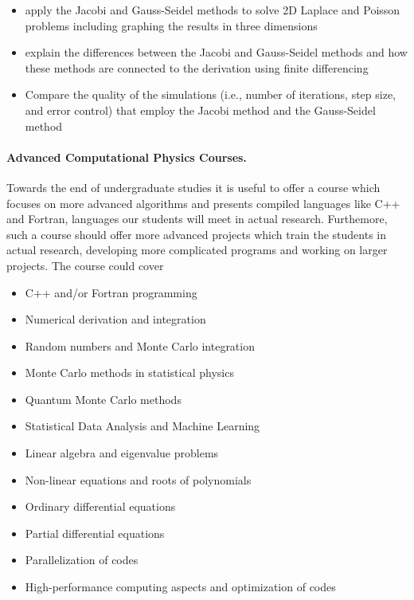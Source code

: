 \documentclass[graybox,envcountchap,sectrefs]{svmult}
\begin{document}
\begin{itemize}
\item apply the Jacobi and Gauss-Seidel methods to solve 2D Laplace and Poisson problems including graphing the results in three dimensions

\item explain the differences between the Jacobi and Gauss-Seidel methods and how these methods are connected to the derivation using finite differencing

\item Compare the quality of the simulations (i.e., number of iterations, step size, and error control) that employ the Jacobi method and the Gauss-Seidel method
\end{itemize}

\noindent
\paragraph{Advanced Computational Physics Courses.}
Towards the end of undergraduate studies it is useful to offer a course which focuses on more advanced algorithms and presents compiled languages like C++ and Fortran, languages our students will meet in actual research.
Furthemore, such a course should offer more advanced projects which train the students in actual research, developing more complicated programs and working on larger projects.
The  course could cover
\begin{itemize}
\item C++ and/or Fortran programming

\item Numerical derivation and integration

\item Random numbers and Monte Carlo integration

\item Monte Carlo methods in statistical physics

\item Quantum Monte Carlo methods

\item Statistical Data Analysis and Machine Learning

\item Linear algebra and eigenvalue problems

\item Non-linear equations and roots of polynomials

\item Ordinary differential equations

\item Partial differential equations

\item Parallelization of codes

\item High-performance computing aspects and optimization of codes
\end{itemize}
\end{document}
